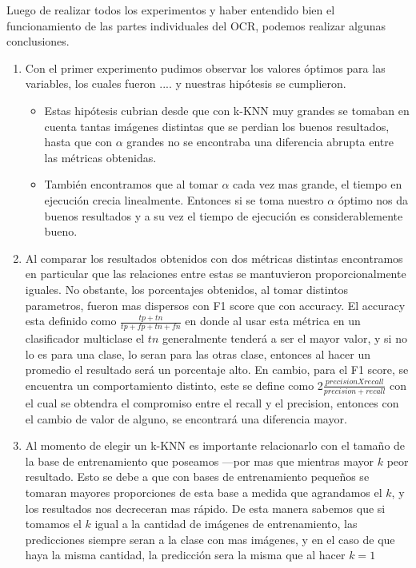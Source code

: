 Luego de realizar todos los experimentos y haber entendido bien el funcionamiento de las partes individuales del OCR, podemos realizar algunas conclusiones.

\begin{enumerate}
	\item Con el primer experimento pudimos observar los valores óptimos para las variables, los cuales fueron .... y nuestras hipótesis se cumplieron. 
	\begin{itemize}
		\item Estas hipótesis cubrian desde que con k-KNN muy grandes se tomaban en cuenta tantas imágenes distintas que se perdian los buenos resultados, hasta que con $\alpha$ grandes no se encontraba una diferencia abrupta entre las métricas obtenidas.
		\item También encontramos que al tomar $\alpha$ cada vez mas grande, el tiempo en ejecución crecia linealmente. Entonces si se toma nuestro $\alpha$ óptimo nos da buenos resultados y a su vez el tiempo de ejecución es considerablemente bueno.
	\end{itemize}
	\item Al comparar los resultados obtenidos con dos métricas distintas encontramos en particular que las relaciones entre estas se mantuvieron proporcionalmente iguales. No obstante, los porcentajes obtenidos, al tomar distintos parametros, fueron mas dispersos con F1 score que con accuracy. El accuracy esta definido como $\frac{tp + tn}{tp + fp + tn + fn}$ en donde al usar esta métrica en un clasificador multiclase el $tn$ generalmente tenderá a ser el mayor valor, y si no lo es para una clase, lo seran para las otras clase, entonces al hacer un promedio el resultado será un porcentaje alto. En cambio, para el F1 score, se encuentra un comportamiento distinto, este se define como 2$\frac{precisionXrecall}{precision + recall}$ con el cual se obtendra el compromiso entre el recall y el precision, entonces con el cambio de valor de alguno, se encontrará una diferencia mayor.
	\item Al momento de elegir un k-KNN es importante relacionarlo con el tamaño de la base de entrenamiento que poseamos ---por mas que mientras mayor $k$ peor resultado. Esto se debe a que con bases de entrenamiento pequeños se tomaran mayores proporciones de esta base a medida que agrandamos el $k$, y los resultados nos decreceran mas rápido. De esta manera sabemos que si tomamos el $k$ igual a la cantidad de imágenes de entrenamiento, las predicciones siempre seran a la clase con mas imágenes, y en el caso de que haya la misma cantidad, la predicción sera la misma que al hacer $k = 1$


\end{enumerate}